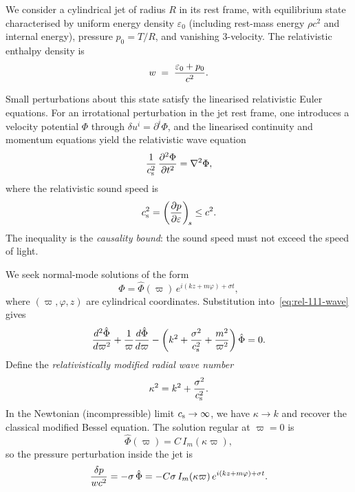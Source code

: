 We consider a cylindrical jet of radius $R$ in its rest frame, with
equilibrium state characterised by uniform energy density
$\varepsilon_{0}$ (including rest-mass energy $\rho c^{2}$ and
internal energy), pressure $p_{0} = T/R$, and vanishing 3-velocity.
The relativistic enthalpy density is
\begin{equation}
\label{eq:rel-111-enthalpy}
w \;=\; \frac{\varepsilon_{0}+p_{0}}{c^{2}}.
\end{equation}

Small perturbations about this state satisfy the linearised
relativistic Euler equations.  For an irrotational perturbation in
the jet rest frame, one introduces a velocity potential $\Phi$
through $\delta u^{i} = \partial^{i}\Phi$, and the linearised
continuity and momentum equations yield the relativistic wave equation
\begin{equation}
\label{eq:rel-111-wave}
\frac{1}{c_{\mathrm{s}}^{2}}\,\frac{\partial^{2}\Phi}{\partial t^{2}}
  = \nabla^{2}\Phi,
\end{equation}
where the relativistic sound speed is
\begin{equation}
\label{eq:rel-111-cs}
c_{\mathrm{s}}^{2} = \left(\frac{\partial p}{\partial\varepsilon}\right)_{\!s}
  \leq c^{2}.
\end{equation}
The inequality is the \emph{causality bound}: the sound speed must
not exceed the speed of light.

We seek normal-mode solutions of the form
\begin{equation}
\label{eq:rel-111-normalmode}
\Phi = \hat{\Phi}(\varpi)\,
  e^{i(kz + m\varphi) + \sigma t},
\end{equation}
where $(\varpi,\varphi,z)$ are cylindrical coordinates.
Substitution into~\eqref{eq:rel-111-wave} gives
\begin{equation}
\label{eq:rel-111-bessel}
\frac{d^{2}\hat{\Phi}}{d\varpi^{2}}
  + \frac{1}{\varpi}\frac{d\hat{\Phi}}{d\varpi}
  - \left(k^{2} + \frac{\sigma^{2}}{c_{\mathrm{s}}^{2}}
    + \frac{m^{2}}{\varpi^{2}}\right)\hat{\Phi} = 0.
\end{equation}
Define the \emph{relativistically modified radial wave number}
\begin{equation}
\label{eq:rel-111-kperp}
\kappa^{2} = k^{2} + \frac{\sigma^{2}}{c_{\mathrm{s}}^{2}}.
\end{equation}
In the Newtonian (incompressible) limit
$c_{\mathrm{s}} \to \infty$, we have $\kappa \to k$ and recover the classical
modified Bessel equation.  The solution regular at $\varpi = 0$ is
\begin{equation}
\label{eq:rel-111-Phi-sol}
\hat{\Phi}(\varpi) = C\,I_{m}(\kappa\varpi),
\end{equation}
so the pressure perturbation inside the jet is
\begin{equation}
\label{eq:rel-111-deltap}
\frac{\delta p}{w c^{2}} =
  -\sigma\,\hat{\Phi} = -C\sigma\,I_{m}(\kappa\varpi)\,
  e^{i(kz+m\varphi)+\sigma t}.
\end{equation}

